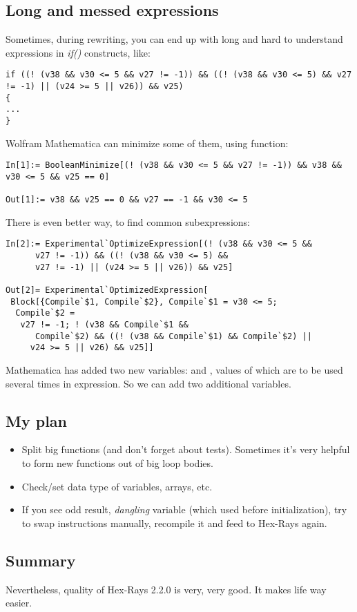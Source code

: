 \subsection{Long and messed expressions}

Sometimes, during rewriting, you can end up with long and hard to understand expressions in \emph{if()} constructs, like:

\begin{lstlisting}[style=customc]
if ((! (v38 && v30 <= 5 && v27 != -1)) && ((! (v38 && v30 <= 5) && v27 != -1) || (v24 >= 5 || v26)) && v25)
{
...
}
\end{lstlisting}

Wolfram Mathematica can minimize some of them, using  function:

\begin{lstlisting}
In[1]:= BooleanMinimize[(! (v38 && v30 <= 5 && v27 != -1)) && v38 && v30 <= 5 && v25 == 0]

Out[1]:= v38 && v25 == 0 && v27 == -1 && v30 <= 5
\end{lstlisting}

There is even better way, to find common subexpressions:

\begin{lstlisting}
In[2]:= Experimental`OptimizeExpression[(! (v38 && v30 <= 5 && 
      v27 != -1)) && ((! (v38 && v30 <= 5) && 
      v27 != -1) || (v24 >= 5 || v26)) && v25]

Out[2]= Experimental`OptimizedExpression[
 Block[{Compile`$1, Compile`$2}, Compile`$1 = v30 <= 5; 
  Compile`$2 = 
   v27 != -1; ! (v38 && Compile`$1 && 
      Compile`$2) && ((! (v38 && Compile`$1) && Compile`$2) || 
     v24 >= 5 || v26) && v25]]
\end{lstlisting}

Mathematica has added two new variables:  and , values of which are to be used several times in expression.
So we can add two additional variables.



\subsection{My plan}

\begin{itemize}
\item Split big functions (and don't forget about tests).
Sometimes it's very helpful to form new functions out of big loop bodies.

\item Check/set data type of variables, arrays, etc.

\item If you see odd result, \emph{dangling} variable (which used before initialization), try to swap instructions manually,
recompile it and feed to Hex-Rays again.
\end{itemize}

\subsection{Summary}

Nevertheless, quality of Hex-Rays 2.2.0 is very, very good.
It makes life way easier.

